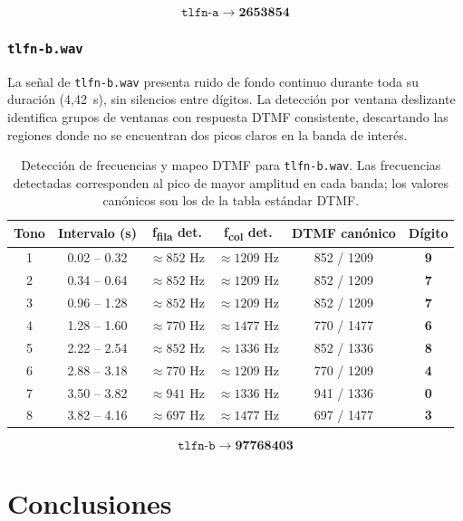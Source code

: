 \documentclass[]{report}
\begin{document}
\[
\boxed{\texttt{tlfn-a} \;\rightarrow\; \textbf{2653854}}
\]

\subsubsection*{\texttt{tlfn-b.wav}}

La señal de \texttt{tlfn-b.wav} presenta ruido de fondo continuo durante toda su duración (4{,}42~s), sin silencios entre dígitos. La detección por ventana deslizante identifica grupos de ventanas con respuesta DTMF consistente, descartando las regiones donde no se encuentran dos picos claros en la banda de interés.

\begin{table}[H]
\centering
\begin{tabular}{cccccc}
\toprule
\textbf{Tono} & \textbf{Intervalo (s)} & \textbf{f\textsubscript{fila} det.} & \textbf{f\textsubscript{col} det.} & \textbf{DTMF canónico} & \textbf{Dígito} \\
\midrule
1 & 0.02 – 0.32 & $\approx 852$ Hz & $\approx 1209$ Hz & 852 / 1209 & \textbf{9} \\
2 & 0.34 – 0.64 & $\approx 852$ Hz & $\approx 1209$ Hz & 852 / 1209 & \textbf{7} \\
3 & 0.96 – 1.28 & $\approx 852$ Hz & $\approx 1209$ Hz & 852 / 1209 & \textbf{7} \\
4 & 1.28 – 1.60 & $\approx 770$ Hz & $\approx 1477$ Hz & 770 / 1477 & \textbf{6} \\
5 & 2.22 – 2.54 & $\approx 852$ Hz & $\approx 1336$ Hz & 852 / 1336 & \textbf{8} \\
6 & 2.88 – 3.18 & $\approx 770$ Hz & $\approx 1209$ Hz & 770 / 1209 & \textbf{4} \\
7 & 3.50 – 3.82 & $\approx 941$ Hz & $\approx 1336$ Hz & 941 / 1336 & \textbf{0} \\
8 & 3.82 – 4.16 & $\approx 697$ Hz & $\approx 1477$ Hz & 697 / 1477 & \textbf{3} \\
\bottomrule
\end{tabular}
\caption{Detección de frecuencias y mapeo DTMF para \texttt{tlfn-b.wav}. Las frecuencias detectadas corresponden al pico de mayor amplitud en cada banda; los valores canónicos son los de la tabla estándar DTMF.}
\end{table}

\[
\boxed{\texttt{tlfn-b} \;\rightarrow\; \textbf{97768403}}
\]

\section*{Conclusiones}
\end{document}

